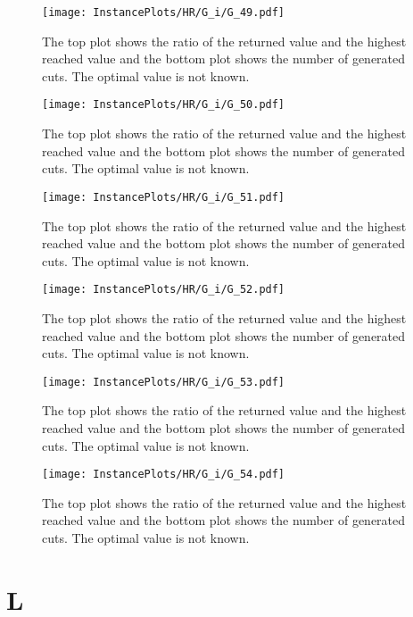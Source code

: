 \documentclass[10pt,a4paper]{article}
\begin{document}
\begin{figure}[H]
\texttt{[image: InstancePlots/HR/G\_i/G\_49.pdf]}
\caption{The top plot shows the ratio of the returned value and the highest reached value     and the bottom plot shows the number of generated cuts. The optimal value is not known.}
\end{figure}

\begin{figure}[H]
\texttt{[image: InstancePlots/HR/G\_i/G\_50.pdf]}
\caption{The top plot shows the ratio of the returned value and the highest reached value     and the bottom plot shows the number of generated cuts. The optimal value is not known.}
\end{figure}

\begin{figure}[H]
\texttt{[image: InstancePlots/HR/G\_i/G\_51.pdf]}
\caption{The top plot shows the ratio of the returned value and the highest reached value     and the bottom plot shows the number of generated cuts. The optimal value is not known.}
\end{figure}

\begin{figure}[H]
\texttt{[image: InstancePlots/HR/G\_i/G\_52.pdf]}
\caption{The top plot shows the ratio of the returned value and the highest reached value     and the bottom plot shows the number of generated cuts. The optimal value is not known.}
\end{figure}

\begin{figure}[H]
\texttt{[image: InstancePlots/HR/G\_i/G\_53.pdf]}
\caption{The top plot shows the ratio of the returned value and the highest reached value     and the bottom plot shows the number of generated cuts. The optimal value is not known.}
\end{figure}

\begin{figure}[H]
\texttt{[image: InstancePlots/HR/G\_i/G\_54.pdf]}
\caption{The top plot shows the ratio of the returned value and the highest reached value     and the bottom plot shows the number of generated cuts. The optimal value is not known.}
\end{figure}

\section{L}
\end{document}
